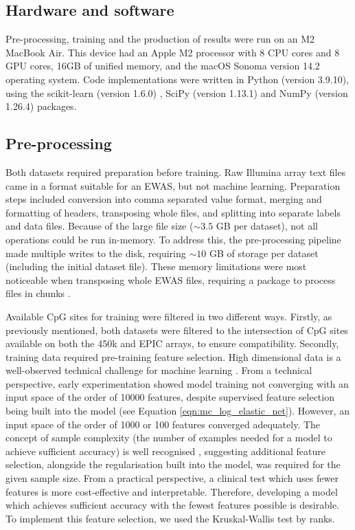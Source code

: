 \documentclass{article} %
\begin{document}
\subsection{Hardware and software}
Pre-processing, training and the production of results were run on an M2 MacBook Air. This device had an Apple M2 processor with 8 CPU cores and 8 GPU cores, 16GB of unified memory, and the macOS Sonoma version 14.2 operating system. Code implementations were written in Python (version 3.9.10), using the scikit-learn (version 1.6.0) \cite{scikit-learn}, SciPy (version 1.13.1) \cite{SciPy} and NumPy (version 1.26.4) \cite{harris2020array} packages.

\subsection{Pre-processing} \label{sec:pre-processing}
Both datasets required preparation before training. Raw Illumina array text files came in a format suitable for an EWAS, but not machine learning. Preparation steps included conversion into comma separated value format, merging and formatting of headers, transposing whole files, and splitting into separate labels and data files. Because of the large file size (\(\sim\!3.5\) GB per dataset), not all operations could be run in-memory. To address this, the pre-processing pipeline made multiple writes to the disk, requiring \(\sim\!10\) GB of storage per dataset (including the initial dataset file). These memory limitations were most noticeable when transposing whole EWAS files, requiring a package to process files in chunks \cite{transposecsv}.

Available CpG sites for training were filtered in two different ways. Firstly, as previously mentioned, both datasets were filtered to the intersection of CpG sites available on both the 450k and EPIC arrays, to ensure compatibility. Secondly, training data required pre-training feature selection. High dimensional data is a well-observed technical challenge for machine learning \cite{cai2018feature}. From a technical perspective, early experimentation showed model training not converging with an input space of the order of \num{10000} features, despite supervised feature selection being built into the model (see Equation \ref{eqn:mc_log_elastic_net}). However, an input space of the order of \num{1000} or \num{100} features converged adequately. The concept of sample complexity (the number of examples needed for a model to achieve sufficient accuracy) is well recognised \cite{blum1997selection}, suggesting additional feature selection, alongside the regularisation built into the model, was required for the given sample size. From a practical perspective, a clinical test which uses fewer features is more cost-effective and interpretable. Therefore, developing a model which achieves sufficient accuracy with the fewest features possible is desirable. To implement this feature selection, we used the Kruskal-Wallis test by ranks.
\end{document}

